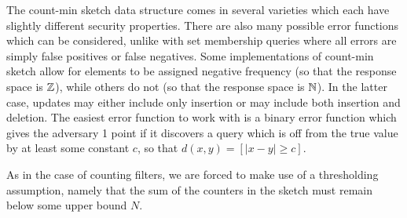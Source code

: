 

The count-min sketch data structure comes in several varieties which each have
slightly different security properties. There are also many possible error
functions which can be considered, unlike with set membership queries where all
errors are simply false positives or false negatives. Some implementations of
count-min sketch allow for elements to be assigned negative frequency (so that
the response space is $\mathbb{Z}$), while others do not (so that the response space is
$\mathbb{N}$). In the latter case, updates may either include only insertion or may
include both insertion and deletion. The easiest error function to work with is
a binary error function which gives the adversary 1 point if it discovers a
query which is off from the true value by at least some constant $c$, so that
$d(x,y) = [|x - y| \ge c]$.


As in the case of counting filters, we are forced to make use of a thresholding
assumption, namely that the sum of the counters in the sketch must remain below
some upper bound $N$.

